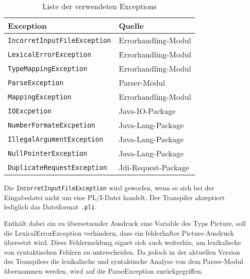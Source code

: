 \begin{table}[h]
	\centering
	
	\begin{tabularx}{\textwidth}{|X|X|}
		\hline
		\textbf{Exception} & \textbf{Quelle}  \\
		\hline
		\verb+IncorretInputFileException+ & Errorhandling-Modul  \\
		
		\verb+LexicalErrorException+ & Errorhandling-Modul  \\
		
		\verb+TypeMappingException+ & Errorhandling-Modul \\
		
		\verb+ParseException+ & Parser-Modul \\
		
		\verb+MappingException+ & Errorhandling-Modul \\
		
		\verb+IOExcpetion+ & Java-IO-Package \\
		
		\verb+NumberFormateExcpetion+ & Java-Lang-Package \\
		
		\verb+IllegalArgumentException+ & Java-Lang-Package \\
		
		\verb+NullPointerException+ & Java-Lang-Package \\
		
		\verb+DuplicateRequestException+ & Jdi-Request-Package \\
		\hline
		
	\end{tabularx}
	
	\caption{Liste der verwendeten Exceptions \label{tab:exceptiontabel}}
\end{table}
Die \verb+IncorretInputFileException+ wird geworfen, wenn
es sich bei der Eingabedatei nicht um eine PL/I-Datei handelt.
Der Transpiler akzeptiert lediglich das Dateiformat \verb+.pli+.

Enthält dabei ein zu übersetzender Ausdruck eine Variable des Typs Picture, soll die LexicalErrorException verhindern, dass ein fehlerhafter Picture-Ausdruck übersetzt wird.
Diese Fehlermeldung eignet sich auch weiterhin, um lexikalische von syntaktischen Fehlern zu unterscheiden. Da jedoch in der aktuellen Version des Transpilers die lexikalische und syntaktische Analyse von dem Parser-Modul übernommen werden, wird auf die ParseException zurückgegriffen.

